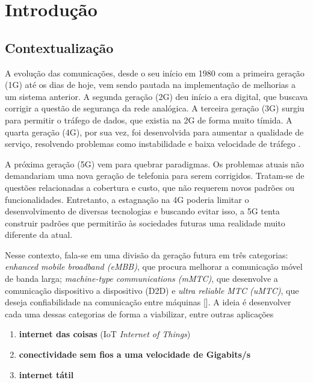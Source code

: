 \chapter{Introdução} \label{introducao}



\section{Contextualização} \label{contextualização}

A evolução das comunicações, desde o seu início em 1980 com a primeira geração (1G) até os dias de hoje, vem sendo pautada na implementação de melhorias a um sistema anterior. A segunda geração (2G) deu início a era digital, que buscava corrigir a questão de segurança da rede analógica. A terceira geração (3G) surgiu para permitir o tráfego de dados, que existia na 2G de forma muito tímida. A quarta geração (4G), por sua vez, foi desenvolvida para aumentar a qualidade de serviço, resolvendo problemas como instabilidade e baixa velocidade de tráfego \cite{Best}. 
\par A próxima geração (5G) vem para quebrar paradigmas. Os problemas atuais não demandariam uma nova geração de telefonia para serem corrigidos. Tratam-se de questões relacionadas a cobertura e custo, que não requerem novos padrões ou funcionalidades. Entretanto, a estagnação na 4G poderia limitar o desenvolvimento de diversas tecnologias e buscando evitar isso, a 5G tenta construir padrões que permitirão às sociedades futuras uma realidade muito diferente da atual.
\par Nesse contexto, fala-se em uma divisão da geração futura em três categorias: \textit{enhanced mobile broadband (eMBB)}, que procura melhorar a comunicação móvel de banda larga; \textit{machine-type communications (mMTC)}, que desenvolve a comunicação dispositivo a dispositivo (D2D) e \textit{ultra reliable MTC (uMTC)}, que deseja confiabilidade na comunicação entre máquinas [\cite{Qualcomm}]. A ideia é desenvolver cada uma dessas categorias de forma a viabilizar, entre outras aplicações \cite{Wunder}

\begin{enumerate}
\item \textbf{internet das coisas} (IoT \textit{Internet of Things})  
\item \textbf{conectividade sem fios a uma velocidade de Gigabits/s}
\item \textbf{internet tátil}
\end{enumerate} 

